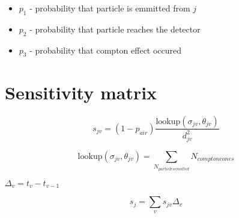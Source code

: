 \begin{itemize}
  \item $p_{1}$ - probability that particle is emmitted from $j$
  \item $p_{2}$ - probability that particle reaches the detector
  \item $p_{3}$ - probability that compton effect occured
\end{itemize}


\section{Sensitivity matrix}
\begin{equation}
  s_{jv} = (1-p_{air})\frac{\mathrm{lookup}(\sigma_{jv}, \theta_{jv})}{d^{2}_{jv}}
\end{equation}


\begin{equation}
  \mathrm{lookup}(\sigma_{jv}, \theta_{jv}) = \sum_{N_{particles emitted}} N_{compton cones} 
\end{equation}

$\Delta_{v} = t_{v} - t_{v-1}$

\begin{equation}
  s_{j} = \sum_{v} s_{jv} \Delta_{v} 
\end{equation}





